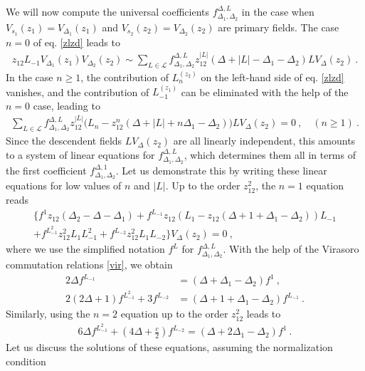 \documentclass[12pt, a4paper, notitlepage, twoside]{report}
\numberwithin{equation}{section}
\theoremstyle{break}
\begin{document}
We will now compute the universal coefficients $f_{\Delta_1,\Delta_2}^{\Delta,L}$ in 
the case when $V_{s_1}(z_1)=V_{\Delta_1}(z_1)$ and $V_{s_2}(z_2)=V_{\Delta_2}(z_2)$ are primary fields.
The case $n=0$ of eq. \eqref{zlzd} leads to
\begin{align}
 z_{12}L_{-1}V_{\Delta_1}(z_1) V_{\Delta_2}(z_2) \sim \sum_{L\in \mathcal{L}} f_{\Delta_1,\Delta_2}^{\Delta,L} z_{12}^{|L|} 
(\Delta+|L|-\Delta_1-\Delta_2) LV_\Delta(z_2)\ .
\label{zot}
\end{align}
In the case $n\geq 1$, the contribution of $L_n^{(z_2)}$ on the left-hand side of eq. \eqref{zlzd} vanishes, and the contribution of $L_{-1}^{(z_1)}$ can be eliminated with the help of the $n=0$ case, leading to
\begin{align}
 \sum_{L\in \mathcal{L}}f_{\Delta_1,\Delta_2}^{\Delta,L} z_{12}^{|L|} \big(L_n-z_{12}^n(\Delta+|L|+n\Delta_1-\Delta_2)\big) LV_\Delta(z_2) = 0\ , \quad (n\geq 1)\ .
\label{sll}
\end{align}
Since the descendent fields $LV_\Delta(z_2)$ are all linearly independent, this amounts to a system of linear equations for $f_{\Delta_1,\Delta_2}^{\Delta,L}$, which determines them all in terms of the first coefficient $f_{\Delta_1,\Delta_2}^{\Delta,1}$.
Let us demonstrate this by writing these linear equations for low values of $n$ and $|L|$.
Up to the order $z_{12}^2$, the $n=1$ equation reads 
\begin{multline}
 \Big\{f^1 z_{12}(\Delta_2-\Delta-\Delta_1) +f^{L_{-1}} z_{12}\left(L_1-z_{12}(\Delta+1+\Delta_1-\Delta_2)\right)L_{-1}  
\\ 
+ f^{L_{-1}^2}z_{12}^2 L_1L_{-1}^2 +  f^{L_{-2}}z_{12}^2 L_1L_{-2}\Big\} V_{\Delta}(z_2) = 0\ ,
\end{multline}
where we use the simplified notation $f^L $ for  $f_{\Delta_1,\Delta_2}^{\Delta,L}$.
With the help of the Virasoro commutation relations \eqref{vir}, we obtain 
\begin{align}
 2\Delta f^{L_{-1}} &= (\Delta+\Delta_1-\Delta_2) f^1 \ ,
\label{flfo}
\\
 2(2\Delta+1) f^{L_{-1}^2} + 3 f^{L_{-2}} & = (\Delta+1+\Delta_1-\Delta_2) f^{L_{-1}}\ .
\end{align}
Similarly, using the $n=2$ equation up to the order $z_{12}^2$ leads to 
\begin{align}
 6\Delta f^{L_{-1}^2} + (4\Delta+\tfrac{c}{2})f^{L_{-2}} = (\Delta+2\Delta_1-\Delta_2) f^1\ .
\end{align}
Let us discuss the solutions of these equations, assuming the normalization condition 
\end{document}
